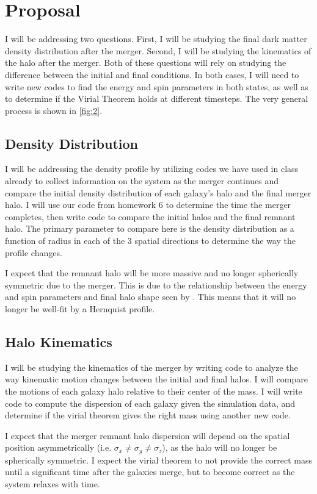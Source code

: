 \documentclass[linenumbers]{aastex631}
\begin{document}
\section{Proposal}

I will be addressing two questions. First, I will be studying the final dark matter density distribution after the merger. Second, I will be studying the kinematics of the halo after the merger. Both of these questions will rely on studying the difference between the initial and final conditions. In both cases, I will need to write new codes to find the energy and spin parameters in both states, as well as to determine if the Virial Theorem holds at different timesteps. The very general process is shown in \ref{fig:2}.
\subsection{Density Distribution}
I will be addressing the density profile by utilizing codes we have used in class already to collect information on the system as the merger continues and compare the initial density distribution of each galaxy's halo and the final merger halo. I will use our code from homework 6 to determine the time the merger completes, then write code to compare the initial halos and the final remnant halo. The primary parameter to compare here is the density distribution as a function of radius in each of the 3 spatial directions to determine the way the profile changes.

I expect that the remnant halo will be more massive and no longer spherically symmetric due to the merger. This is due to the relationship between the energy and spin parameters and final halo shape seen by \cite{DrakosB}. This means that it will no longer be well-fit by a Hernquist profile.

\subsection{Halo Kinematics}
I will be studying the kinematics of the merger by writing code to analyze the way kinematic motion changes between the initial and final halos. I will compare the motions of each galaxy halo relative to their center of the mass. I will write code to compute the dispersion of each galaxy given the simulation data, and determine if the virial theorem gives the right mass using another new code.

I expect that the merger remnant halo dispersion will depend on the spatial position asymmetrically (i.e. $\sigma_x \neq \sigma_y \neq \sigma_z$), as the halo will no longer be spherically symmetric. I expect the virial theorem to not provide the correct mass until a significant time after the galaxies merge, but to become correct as the system relaxes with time.
\end{document}
